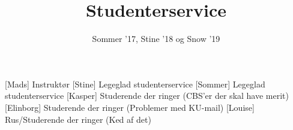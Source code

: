 \documentclass[a4paper,11pt]{article}
\title{Studenterservice}
\author{Sommer '17, Stine '18 og Snow '19}
\begin{document}
\maketitle

\begin{roles}
[Mads] Instruktør
[Stine] Legeglad studenterservice
[Sommer] Legeglad studenterservice
[Kasper] Studerende der ringer (CBS'er der skal have merit)
[Elinborg] Studerende der ringer (Problemer med KU-mail)
[Louise] Rus/Studerende der ringer (Ked af det)
\end{roles}

\begin{props}

\end{props}
\end{document}
